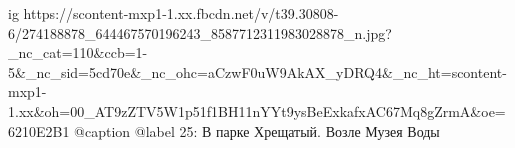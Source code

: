  
 
 
 
 

\ifcmt
  ig https://scontent-mxp1-1.xx.fbcdn.net/v/t39.30808-6/274188878_644467570196243_8587712311983028878_n.jpg?_nc_cat=110&ccb=1-5&_nc_sid=5cd70e&_nc_ohc=aCzwF0uW9AkAX_yDRQ4&_nc_ht=scontent-mxp1-1.xx&oh=00_AT9zZTV5W1p51f1BH11nYYt9ysBeExkafxAC67Mq8gZrmA&oe=6210E2B1
  @caption @label 25: В парке Хрещатый. Возле Музея Воды
\fi
